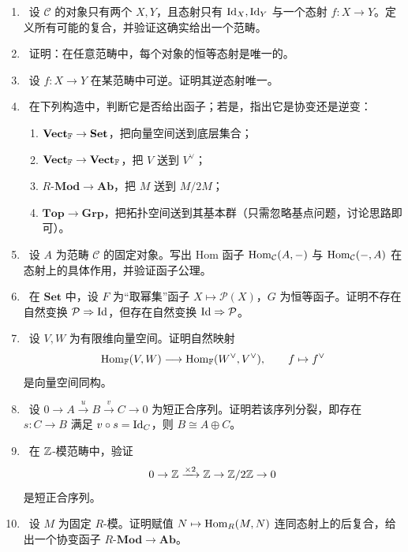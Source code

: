 \begin{enumerate}[label=\textbf{习题A.\arabic*}, leftmargin=3.5em]
  \item \basic\ 设 $\mathcal C$ 的对象只有两个 $X,Y$，且态射只有 $\mathrm{Id}_X,\mathrm{Id}_Y$ 与一个态射 $f\colon X\to Y$。定义所有可能的复合，并验证这确实给出一个范畴。

  \item \basic\ 证明：在任意范畴中，每个对象的恒等态射是唯一的。

  \item \basic\ 设 $f\colon X\to Y$ 在某范畴中可逆。证明其逆态射唯一。

  \item \basic\ 在下列构造中，判断它是否给出函子；若是，指出它是协变还是逆变：
  \begin{enumerate}[label=(\alph*), leftmargin=2.5em]
    \item $\mathbf{Vect}_{\mathbb{F}}\to \mathbf{Set}$，把向量空间送到底层集合；
    \item $\mathbf{Vect}_{\mathbb{F}}\to \mathbf{Vect}_{\mathbb{F}}$，把 $V$ 送到 $V^{\vee}$；
    \item $R\text{-}\mathbf{Mod}\to \mathbf{Ab}$，把 $M$ 送到 $M/2M$；
    \item $\mathbf{Top}\to \mathbf{Grp}$，把拓扑空间送到其基本群（只需忽略基点问题，讨论思路即可）。
  \end{enumerate}

  \item \basic\ 设 $A$ 为范畴 $\mathcal C$ 的固定对象。写出 Hom 函子 $\mathrm{Hom}_{\mathcal C}(A,-)$ 与 $\mathrm{Hom}_{\mathcal C}(-,A)$ 在态射上的具体作用，并验证函子公理。

  \item \basic\ 在 $\mathbf{Set}$ 中，设 $F$ 为“取幂集”函子 $X\mapsto \mathcal P(X)$，$G$ 为恒等函子。证明不存在自然变换 $\mathcal P\Rightarrow \mathrm{Id}$，但存在自然变换 $\mathrm{Id}\Rightarrow \mathcal P$。

  \item \basic\ 设 $V,W$ 为有限维向量空间。证明自然映射
  \[
    \mathrm{Hom}_{\mathbb{F}}(V,W)\longrightarrow \mathrm{Hom}_{\mathbb{F}}(W^{\vee},V^{\vee}),
    \qquad f\mapsto f^{\vee}
  \]
  是向量空间同构。

  \item \basic\ 设 $0\to A\xrightarrow{u}B\xrightarrow{v}C\to 0$ 为短正合序列。证明若该序列分裂，即存在 $s\colon C\to B$ 满足 $v\circ s=\mathrm{Id}_C$，则 $B\cong A\oplus C$。

  \item \basic\ 在 $\mathbb{Z}$-模范畴中，验证
  \[
    0\to \mathbb{Z} \xrightarrow{\times 2} \mathbb{Z} \to \mathbb{Z}/2\mathbb{Z} \to 0
  \]
  是短正合序列。

  \item \basic\ 设 $M$ 为固定 $R$-模。证明赋值 $N\mapsto \mathrm{Hom}_R(M,N)$ 连同态射上的后复合，给出一个协变函子 $R\text{-}\mathbf{Mod}\to \mathbf{Ab}$。
\end{enumerate}

